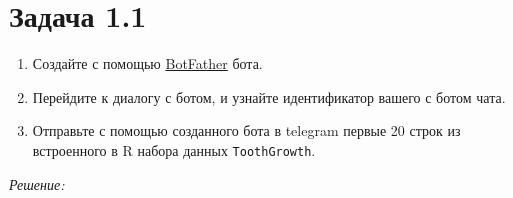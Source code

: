 \documentclass[
]{book}
\providecommand{\tightlist}{%
  \setlength{\itemsep}{0pt}\setlength{\parskip}{0pt}}
\begin{document}
\section*{Задача 1.1}\label{ux437ux430ux434ux430ux447ux430-1.1}

\begin{enumerate}
\def\labelenumi{\arabic{enumi}.}
\tightlist
\item
  Создайте с помощью \href{http://t.me/BotFather}{BotFather} бота.
\item
  Перейдите к диалогу с ботом, и узнайте идентификатор вашего с ботом чата.
\item
  Отправьте с помощью созданного бота в telegram первые 20 строк из встроенного в R набора данных \texttt{ToothGrowth}.
\end{enumerate}

\emph{Решение:}
\end{document}
